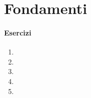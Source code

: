 \chapter{Fondamenti}\label{fondamenti}
\subsubsection*{Esercizi}
\begin{enumerate}
	\item
	\item
	\item
	\item
	\item
\end{enumerate}
